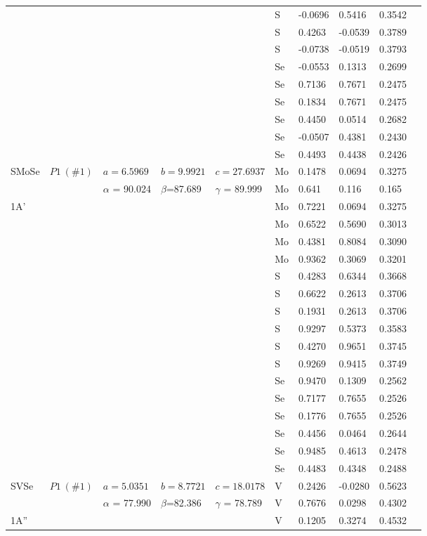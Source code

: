 \documentclass[a4paperm]{article}
\begin{document}
\begin{longtable}[c]{l*{9}{l}}
	&&&&&	S	&	-0.0696	&	0.5416	&	0.3542	\\
	&&&&&	S	&	0.4263	&	-0.0539	&	0.3789	\\
	&&&&&	S	&	-0.0738	&	-0.0519	&	0.3793	\\
	&&&&&	Se	&	-0.0553	&	0.1313	&	0.2699	\\
	&&&&&	Se	&	0.7136	&	0.7671	&	0.2475	\\
	&&&&&	Se	&	0.1834	&	0.7671	&	0.2475	\\
	&&&&&	Se	&	0.4450	&	0.0514	&	0.2682	\\
	&&&&&	Se	&	-0.0507	&	0.4381	&	0.2430	\\
	&&&&&	Se	&	0.4493	&	0.4438	&	0.2426	\\
	\hline 
	SMoSe & $P1\ (\#1)$  &	$a=6.5969$ & $b=9.9921$ & $c=27.6937$  & Mo  &0.1478 &0.0694  &0.3275 \\
	&&$\alpha$ = 90.024& $\beta$=87.689& $\gamma$ = 89.999& Mo &0.641 &0.116 &0.165\\
	1A'&&&&&	Mo	&	0.7221	&	0.0694	&	0.3275	\\
	&&&&&	Mo	&	0.6522	&	0.5690	&	0.3013	\\
	&&&&&	Mo	&	0.4381	&	0.8084	&	0.3090	\\
	&&&&&	Mo	&	0.9362	&	0.3069	&	0.3201	\\
	&&&&&	S	&	0.4283	&	0.6344	&	0.3668	\\
	&&&&&	S	&	0.6622	&	0.2613	&	0.3706	\\
	&&&&&	S	&	0.1931	&	0.2613	&	0.3706	\\
	&&&&&	S	&	0.9297	&	0.5373	&	0.3583	\\
	&&&&&	S	&	0.4270	&	0.9651	&	0.3745	\\
	&&&&&	S	&	0.9269	&	0.9415	&	0.3749	\\
	&&&&&	Se	&	0.9470	&	0.1309	&	0.2562	\\
	&&&&&	Se	&	0.7177	&	0.7655	&	0.2526	\\
	&&&&&	Se	&	0.1776	&	0.7655	&	0.2526	\\
	&&&&&	Se	&	0.4456	&	0.0464	&	0.2644	\\
	&&&&&	Se	&	0.9485	&	0.4613	&	0.2478	\\
	&&&&&	Se	&	0.4483	&	0.4348	&	0.2488	\\
	\hline
	SVSe & $P1\ (\#1)$  &	$a=5.0351$ & $b=8.7721$ & $c=18.0178$  & V	&	0.2426	&	-0.0280	&	0.5623	\\
	&&$\alpha$ = 77.990& $\beta$=82.386& $\gamma$ = 78.789  & V	&	0.7676	&	0.0298	&	0.4302	\\		
	1A''&&&&&	V	&	0.1205	&	0.3274	&	0.4532	\\

\end{longtable}
\end{document}
